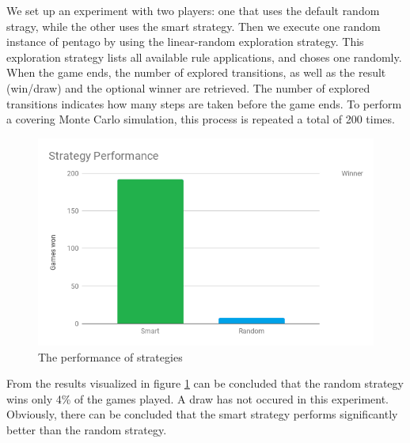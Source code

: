 \vspace{6pt}

We set up an experiment with two players: one that uses the default random stragy, while the other uses the smart strategy. 
Then we execute one random instance of pentago by using the linear-random exploration strategy. This exploration strategy lists all available rule applications, and choses one randomly.
When the game ends, the number of explored transitions, as well as the result (win/draw) and the optional winner are retrieved.
The number of explored transitions indicates how many steps are taken before the game ends.
To perform a covering Monte Carlo simulation, this process is repeated a total of 200 times.

\vspace{6pt}

\begin{figure}[h]
  \centering
  \includegraphics[scale=0.5,clip]{Images/strategywinner}
  \caption{The performance of strategies}
  \label{fig:strategywinner}
\end{figure}

From the results visualized in figure \ref{fig:strategywinner} can be concluded that the random strategy wins only 4\% of the games played. A draw has not occured in this experiment.
Obviously, there can be concluded that the smart strategy performs significantly better than the random strategy.

\vspace{6pt}

